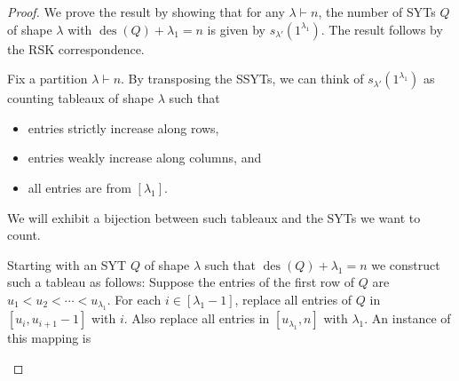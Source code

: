 \documentclass[12pt]{article}
\newcommand{\des}{\operatorname{des}}
\theoremstyle{definition}
\begin{document}
\begin{proof}
    We prove the result by showing that for any $\lambda \vdash n$, the number of SYTs $Q$ of shape $\lambda$ with $\des(Q) + \lambda_1 = n$ is given by $s_{\lambda'}(1^{\lambda_1})$. 
    The result follows by the RSK correspondence.

    Fix a partition $\lambda \vdash n$. 
    By transposing the SSYTs, we can think of $s_{\lambda'}(1^{\lambda_1})$ as counting tableaux of shape $\lambda$ such that
    \begin{itemize}
        \item entries strictly increase along rows,
        \item entries weakly increase along columns, and
        \item all entries are from $[\lambda_1]$.
    \end{itemize}
    We will exhibit a bijection between such tableaux and the SYTs we want to count.
    
    Starting with an SYT $Q$ of shape $\lambda$ such that $\des(Q) + \lambda_1 = n$ we construct such a tableau as follows: 
    Suppose the entries of the first row of $Q$ are $u_1 < u_2 < \cdots < u_{\lambda_1}$. 
    For each $i \in [\lambda_1 - 1]$, replace all entries of $Q$ in $[u_i, u_{i + 1} - 1]$ with $i$. 
    Also replace all entries in $[u_{\lambda_1}, n]$ with $\lambda_1$. 
    An instance of this mapping is
    \vspace{0.2cm}
    \begin{center}
    \end{center}
    

\end{proof}
\end{document}
